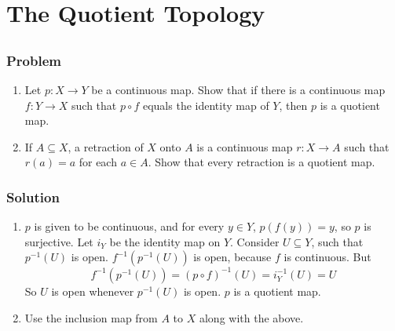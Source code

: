 \setcounter{section}{20} %
\section{The Quotient Topology}
\label{sec-topspace-quotient}
 

\setcounter{subsection}{1} %
\subsection{}

\subsubsection{Problem}
\begin{enumerate}
\item Let $p : X \to Y$ be a continuous map. Show that if there is a continuous map $f : Y \to X$ such that $p \circ f$ equals the identity map of $Y$, then $p$ is a quotient map.
\item If $ A \subseteq X$, a retraction of $X$ onto $A$ is a continuous map $r : X \to A$ such that $r(a) = a$ for each $a \in A$. Show that every retraction is a quotient map.
\end{enumerate}

\subsubsection{Solution}
\begin{enumerate}
\item $p$ is given to be continuous, and for every $y \in Y$, $p(f(y)) = y$, so $p$ is surjective. Let $i_Y$ be the identity map on $Y$. Consider $U \subseteq Y$, such that $p^{-1}(U)$ is open. $f^{-1}(p^{-1}(U))$ is open, because $f$ is continuous. But
\[f^{-1}(p^{-1}(U)) = (p \circ f)^{-1}(U) = i_Y^{-1}(U) = U\]
So $U$ is open whenever $p^{-1}(U)$ is open. $p$ is a quotient map.
\item Use the inclusion map from $A$ to $X$ along with the above.
\end{enumerate}
